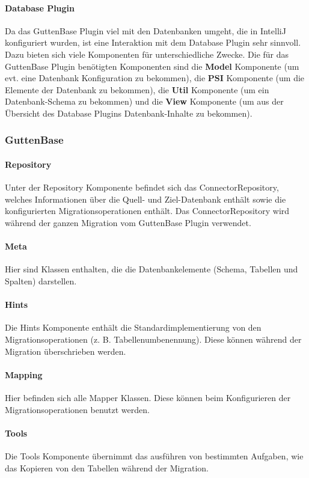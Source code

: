 	\paragraph*{Database Plugin}
	Da das GuttenBase Plugin viel mit den Datenbanken umgeht, die in IntelliJ konfiguriert wurden, ist eine Interaktion mit dem Database Plugin sehr sinnvoll. Dazu bieten sich viele Komponenten für unterschiedliche Zwecke. Die für das GuttenBase Plugin benötigten Komponenten sind die \textbf{Model} Komponente (um evt. eine Datenbank Konfiguration zu bekommen), die \textbf{PSI} Komponente (um die Elemente der Datenbank zu bekommen), die \textbf{Util} Komponente (um ein Datenbank-Schema zu bekommen) und die \textbf{View} Komponente (um aus der Übersicht des Database  Plugins Datenbank-Inhalte zu bekommen).
	
	
	\subsubsection{GuttenBase} 
	\paragraph*{Repository}
	Unter der Repository Komponente befindet sich das ConnectorRepository, welches Informationen über die Quell- und Ziel-Datenbank enthält sowie die konfigurierten Migrationsoperationen enthält. Das ConnectorRepository wird während der ganzen Migration vom GuttenBase Plugin verwendet.
	\paragraph*{Meta}
	Hier sind Klassen enthalten, die die Datenbankelemente (Schema, Tabellen und Spalten) darstellen.
	\paragraph*{Hints}
	Die Hints Komponente enthält die Standardimplementierung von den Migrationsoperationen (z. B. Tabellenumbenennung). Diese können während der Migration überschrieben werden.
	\paragraph*{Mapping}
	Hier befinden sich alle Mapper Klassen. Diese können beim Konfigurieren der Migrationsoperationen benutzt werden.
	\paragraph*{Tools}
	Die Tools Komponente übernimmt das ausführen von bestimmten Aufgaben, wie das Kopieren von den Tabellen während der Migration.
